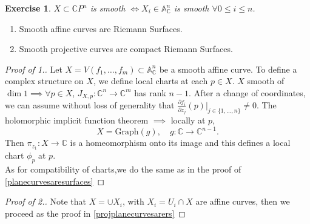 \documentclass{article}
\newtheorem{exercise}{Exercise}
\begin{document}
\begin{exercise}
$X \subset \mathbb{C} P^n$ is smooth $\iff X_i \in \mathbb{A}_{\mathbb{C}}^n$ is smooth $\forall 0 \le i \le n$.
\end{exercise}

\begin{theorem} \label{curvesaresurfaces}
\begin{enumerate}[1.]
    \item Smooth affine curves are Riemann Surfaces.
    \item Smooth projective curves are compact Riemann Surfaces.
\end{enumerate}
\end{theorem}

\begin{proof}[Proof of 1.]
Let $X = V(f_1, \ldots, f_m) \subset \mathbb{A}_{\mathbb{C}}^n$ be a smooth affine curve.
To define a complex structure on $X$, we define local charts at each $p \in X$.
$X$ smooth of $\dim 1 \implies \forall p \in X$, $J_{X, p} : \mathbb{C}^n \to \mathbb{C}^m$ has rank $n-1$.
After a change of coordinates, we can assume without loss of generality that $\frac{\partial f_i}{\partial z_j} (p)|_{j \in \{ 1, \ldots, n \}} \ne 0$.
The holomorphic implicit function theorem $\implies$ locally at $p$,
$$
X = \text{Graph}(g), \quad g: \mathbb{C} \to \mathbb{C}^{n-1}.
$$
Then $\pi_{z_1}: X \to \mathbb{C}$ is a homeomorphism onto its image and this defines a local chart $\phi_p$ at $p$.\\
\noindent As for compatibility of charts,we do the same as in the proof of  \ref{planecurvesaresurfaces}

\end{proof}
\begin{proof}[Proof of 2.]
    Note that $X=\cup X_i$, with $X_i=U_i \cap X$ are affine curves, then we proceed as the proof in \ref{projplanecurvesarers}
\end{proof}
\end{document}

